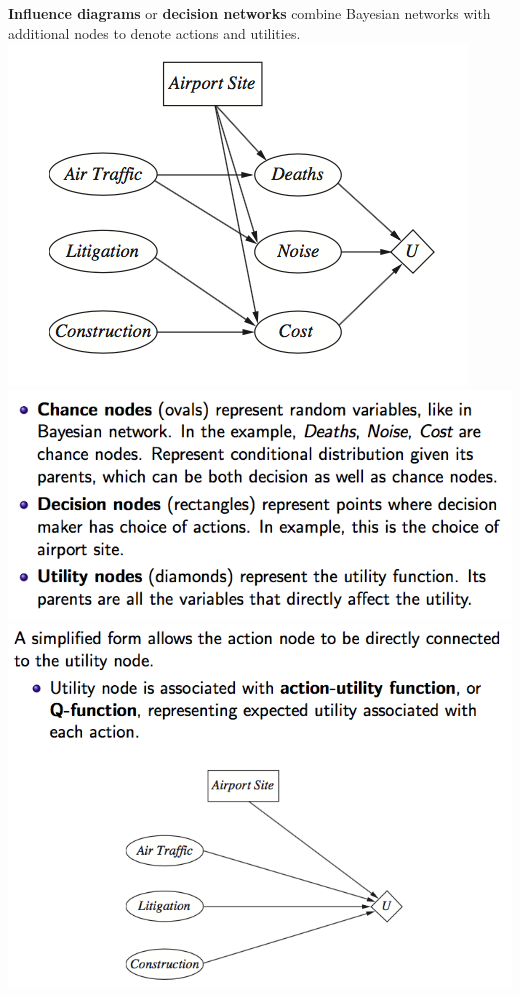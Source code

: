 \documentclass[12pt]{article}
\begin{document}
\begin{tcolorbox}
\textbf{Influence diagrams} or \textbf{decision networks} combine Bayesian networks with additional nodes to denote actions and utilities.\\

\includegraphics[scale=0.4]{p21}\\
\includegraphics[scale=0.35]{p22}
\includegraphics[scale=0.35]{p23}
\end{tcolorbox}
\end{document}
